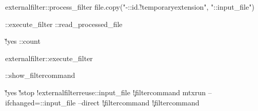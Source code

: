 \starttexdefinition externalfilter::process_filter
     \startmode[\s!mkiv]
         \startluacode
           file.copy("\jobname-\externalfilter::id.\f!temporaryextension", "\externalfilter::input_file")
         \stopluacode
     \stopmode
           

     \externalfilter::execute_filter
     \externalfilter::read_processed_file
     \endgroup 

     \v!yes
          {\doglobal\expandafter\increment\csname\externalfilter::count\endcsname}

     \dorechecknextindentation
\stoptexdefinition


\starttexdefinition externalfilter::execute_filter

   \directsetup
   \externalfilter::show_filtercommand

   \v!yes
       {\v!stop
            {\showmessage\m!externalfilter{reuse}\externalfilter::input_file}
            {
               {
                   {
                    \executesystemcommand
                      {\externalfilterparameter\c!filtercommand}}
                   {\executesystemcommand
                    {mtxrun --ifchanged=\externalfilter::input_file\space 
                        --direct \externalfilterparameter\c!filtercommand}}}}}
       {\executesystemcommand
          {\externalfilterparameter\c!filtercommand}}
\stoptexdefinition

